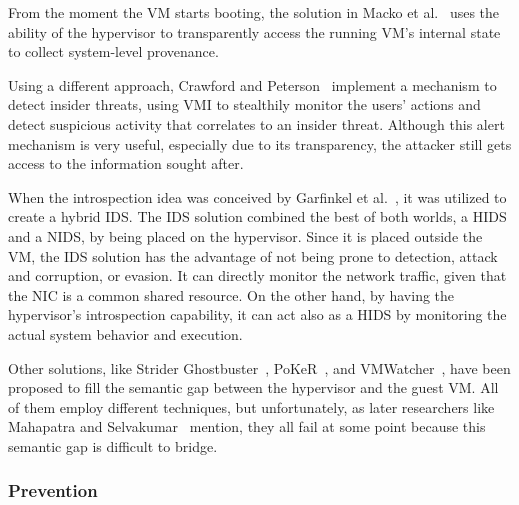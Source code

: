 \par From the moment the \ac{VM} starts booting, the solution in Macko et al.~\cite{macko2011collecting} uses the ability of the hypervisor to transparently access the running \ac{VM}’s internal state to collect system-level provenance. 

\par Using a different approach, Crawford and Peterson~\cite{crawford2013insider} implement a mechanism to detect insider threats, using \ac{VMI} to stealthily monitor the users' actions and detect suspicious activity that correlates to an insider threat. Although this alert mechanism is very useful, especially due to its transparency, the attacker still gets access to the information sought after.

\par When the introspection idea was conceived by Garfinkel et al.~\cite{garfinkel2003virtual}, it was utilized to create a hybrid \ac{IDS}. The \ac{IDS} solution combined the best of both worlds, a \ac{HIDS} and a \ac{NIDS}, by being placed on the hypervisor. Since it is placed outside the \ac{VM}, the IDS solution has the advantage of not being prone to detection, attack and corruption, or evasion. It can directly monitor the network traffic, given that the \ac{NIC} is a common shared resource. On the other hand, by having the hypervisor’s introspection capability, it can act also as a \ac{HIDS} by monitoring the actual system behavior and execution. 

\par Other solutions, like Strider Ghostbuster~\cite{wang2005detecting}, PoKeR~\cite{riley2009multi}, and VMWatcher~\cite{jiang2007stealthy}, have been proposed to fill the semantic gap between the hypervisor and the guest \ac{VM}. All of them employ different techniques, but unfortunately, as later researchers like Mahapatra and Selvakumar~\cite{mahapatra2011online} mention, they all fail at some point because this semantic gap is difficult to bridge. 

\subsubsection{Prevention}

